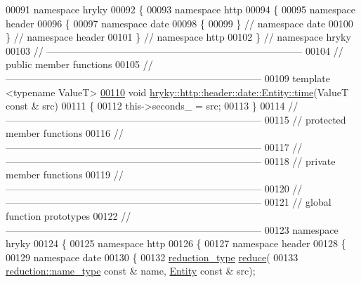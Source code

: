 \begin{DoxyCode}
00091 \textcolor{keyword}{namespace }hryky
00092 \{
00093 \textcolor{keyword}{namespace }http
00094 \{
00095 \textcolor{keyword}{namespace }header
00096 \{
00097 \textcolor{keyword}{namespace }date
00098 \{
00099 \} \textcolor{comment}{// namespace date}
00100 \} \textcolor{comment}{// namespace header}
00101 \} \textcolor{comment}{// namespace http}
00102 \} \textcolor{comment}{// namespace hryky}
00103 \textcolor{comment}{//
      ------------------------------------------------------------------------------}
00104 \textcolor{comment}{// public member functions}
00105 \textcolor{comment}{//
      ------------------------------------------------------------------------------}
00109 \textcolor{comment}{}\textcolor{keyword}{template} <\textcolor{keyword}{typename} ValueT>
\hypertarget{http__header__date__entity_8h_source_l00110}{}\hyperlink{classhryky_1_1http_1_1header_1_1date_1_1_entity_abbbedfa21934cd6f73cdcff37e53a1f4}{00110} \textcolor{keywordtype}{void} \hyperlink{classhryky_1_1http_1_1header_1_1date_1_1_entity_abbbedfa21934cd6f73cdcff37e53a1f4}{hryky::http::header::date::Entity::time}(ValueT \textcolor{keyword}{const} & src)
00111 \{
00112     this->seconds\_ = src;
00113 \}
00114 \textcolor{comment}{//
      ------------------------------------------------------------------------------}
00115 \textcolor{comment}{// protected member functions}
00116 \textcolor{comment}{//
      ------------------------------------------------------------------------------}
00117 \textcolor{comment}{//
      ------------------------------------------------------------------------------}
00118 \textcolor{comment}{// private member functions}
00119 \textcolor{comment}{//
      ------------------------------------------------------------------------------}
00120 \textcolor{comment}{//
      ------------------------------------------------------------------------------}
00121 \textcolor{comment}{// global function prototypes}
00122 \textcolor{comment}{//
      ------------------------------------------------------------------------------}
00123 \textcolor{keyword}{namespace }hryky
00124 \{
00125 \textcolor{keyword}{namespace }http
00126 \{
00127 \textcolor{keyword}{namespace }header
00128 \{
00129 \textcolor{keyword}{namespace }date
00130 \{
00132     \hyperlink{classhryky_1_1_intrusive_ptr}{reduction_type} \hyperlink{namespacehryky_1_1http_a08fc36a78a8e2908140fcd102829a566}{reduce}(
00133         \hyperlink{classhryky_1_1reduction_1_1_string}{reduction::name_type} \textcolor{keyword}{const} & name, \hyperlink{classhryky_1_1http_1_1header_1_1date_1_1_entity}{Entity} \textcolor{keyword}{const} & src);

\end{DoxyCode}
